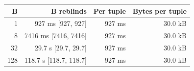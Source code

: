 \begin{tabular}{rrrr}
\toprule
B & B reblinds & Per tuple & Bytes per tuple \\
\midrule
1 & 927 ms [927, 927] & 927 ms & 30.0 kB \\
8 & 7416 ms [7416, 7416] & 927 ms & 30.0 kB \\
32 & 29.7 s [29.7, 29.7] & 927 ms & 30.0 kB \\
128 & 118.7 s [118.7, 118.7] & 927 ms & 30.0 kB \\
\bottomrule
\end{tabular}
